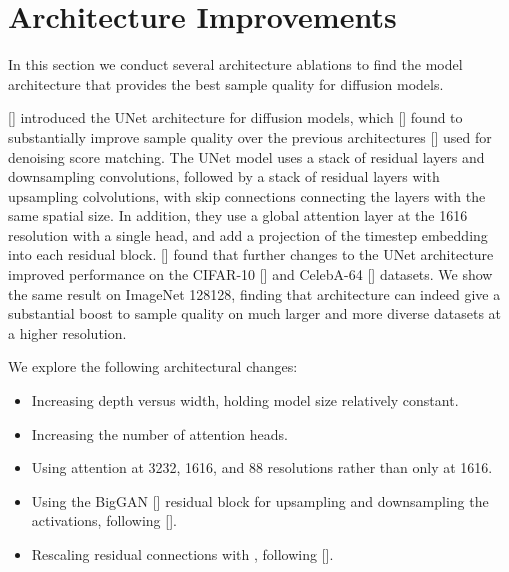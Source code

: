 \documentclass{article}
\newcommand{\shortcite}[1]{[\citenum{#1}]}
\newcommand{\namecite}[1]{\citeauthor{#1} [\citenum{#1}]}
\begin{document}
\section{Architecture Improvements}
\label{sec:archablation}
In this section we conduct several architecture ablations to find the model architecture that provides the best sample quality for diffusion models.

\namecite{ddpm} introduced the UNet architecture for diffusion models, which \namecite{adversarial} found to substantially improve sample quality over the previous architectures \shortcite{improvedscore,refinenet} used for denoising score matching. The UNet model uses a stack of residual layers and downsampling convolutions, followed by a stack of residual layers with upsampling colvolutions, with skip connections connecting the layers with the same spatial size. In addition, they use a global attention layer at the 1616 resolution with a single head, and add a projection of the timestep embedding into each residual block. \namecite{sde} found that further changes to the UNet architecture improved performance on the CIFAR-10 \shortcite{cifar10} and CelebA-64 \shortcite{celeba} datasets. We show the same result on ImageNet 128128, finding that architecture can indeed give a substantial boost to sample quality on much larger and more diverse datasets at a higher resolution.

We explore the following architectural changes:

\begin{itemize}
  \item Increasing depth versus width, holding model size relatively constant.
  \item Increasing the number of attention heads.
  \item Using attention at 3232, 1616, and 88 resolutions rather than only at 1616.
  \item Using the BigGAN \shortcite{biggan} residual block for upsampling and downsampling the activations, following \shortcite{sde}.
  \item Rescaling residual connections with , following \shortcite{sde,stylegan,stylegan2}.
\end{itemize}
\end{document}
